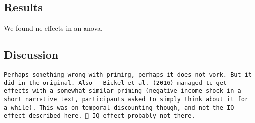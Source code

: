 \documentclass[
]{article}
\begin{document}
\hypertarget{results}{%
\subsection{Results}\label{results}}

We found no effects in an anova.

\hypertarget{discussion}{%
\subsection{Discussion}\label{discussion}}

\begin{verbatim}
Perhaps something wrong with priming, perhaps it does not work. But it did in the original. Also - Bickel et al. (2016) managed to get effects with a somewhat similar priming (negative income shock in a short narrative text, participants asked to simply think about it for a while). This was on temporal discounting though, and not the IQ-effect described here.  IQ-effect probably not there. 
\end{verbatim}
\end{document}
